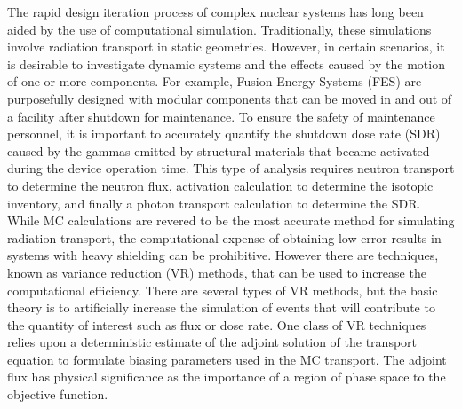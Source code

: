 The rapid design iteration process of complex nuclear systems has long been
aided by the use of computational simulation.  Traditionally, these simulations
involve radiation transport in static geometries.  However, in certain
scenarios, it is desirable to investigate dynamic systems and the effects caused
by the motion of one or more components.  
For example, Fusion Energy Systems
(FES) are purposefully designed with modular components that can be moved in and
out of a facility after shutdown for maintenance.  
To ensure the safety of maintenance personnel, it is important to accurately quantify the
shutdown dose rate (SDR) caused by the gammas emitted by structural materials that became 
activated during the device operation time.  
This type of analysis requires neutron transport to determine the neutron flux,
activation calculation to determine the isotopic inventory, and finally a 
photon transport calculation to determine the SDR.
While MC calculations are revered to be the most accurate method for simulating
radiation transport, the computational expense of obtaining low error results 
in systems with heavy shielding can be prohibitive.  
However there are techniques, known as variance reduction (VR)
methods, that can be used to increase the computational efficiency.  
There are several types
of VR methods, but the basic theory is to artificially increase the simulation of
events that will contribute to the quantity of interest such as flux or dose
rate. 
 One class of VR techniques relies upon a deterministic estimate of the adjoint 
solution of the transport equation to
formulate biasing parameters used in the MC transport. 
The adjoint flux has physical significance as the importance of a region of
phase space to the objective function.

